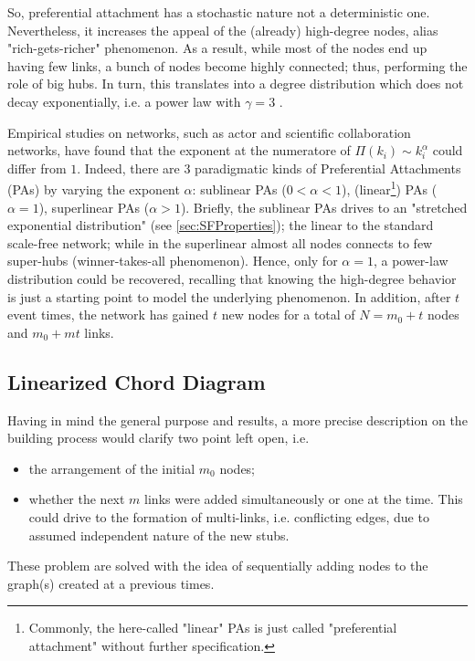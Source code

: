 \documentclass[a4paper,12pt,twoside]{book} %
\theoremstyle{definition}
\begin{document}
So, preferential attachment has a stochastic nature not a deterministic one. Nevertheless, it increases the appeal of the (already) high-degree nodes, alias \label{cit:S.Sagone} "rich-gets-richer" phenomenon. As a result, while most of the nodes end up having few links, a bunch of nodes become highly connected; thus, performing the role of big hubs. In turn, this translates into a degree distribution which does not decay exponentially, i.e. a power law with $\gamma = 3$ \cite{barabasi::2016networkbook}. 

Empirical studies on networks, such as actor and scientific collaboration networks, have found that the exponent at the numeratore of $\Pi(k_i) \sim k_i^\alpha$ could differ from $1$.
Indeed, there are $3$ paradigmatic kinds of Preferential Attachments (PAs) by varying the exponent $\alpha$: sublinear PAs ($0<\alpha<1$), (linear\footnote{Commonly, the here-called "linear" PAs is just called "preferential attachment" without further specification.}) PAs ($\alpha = 1$), superlinear PAs ($\alpha>1$). Briefly, the sublinear PAs drives to an "stretched exponential distribution" (see \autoref{sec:SFProperties}); the linear to the standard scale-free network; while in the superlinear almost all nodes connects to few super-hubs (winner-takes-all phenomenon).
Hence, only for $\alpha = 1$, a power-law distribution could be recovered, recalling that knowing the high-degree behavior is just a starting point to model the underlying phenomenon. 
In addition, after $t$ event times, the network has gained $t$ new nodes for a total of $N = m_0 + t$ nodes and $m_0 + mt$ links.

\newpage
\subsection{Linearized Chord Diagram}
Having in mind the general purpose and results, a more precise description on the building process would clarify two point left open, i.e. 
\begin{itemize}
	\item the arrangement of the initial $m_0$ nodes;
	\item whether the next $m$ links were added simultaneously or one at the time. This could drive to the formation of multi-links, i.e. conflicting edges, due to assumed independent nature of the new stubs. 
\end{itemize}

These problem are solved with the idea of sequentially adding nodes to the graph(s) created at a previous times.
\end{document}
